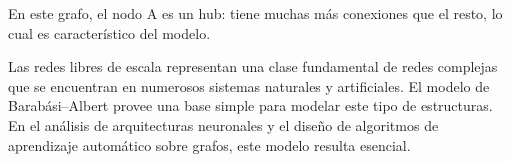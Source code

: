 En este grafo, el nodo A es un hub: tiene muchas más conexiones que el resto, lo cual es característico del modelo.

Las redes libres de escala representan una clase fundamental de redes complejas que se encuentran en numerosos sistemas naturales y artificiales. El modelo de Barabási–Albert provee una base simple para modelar este tipo de estructuras. En el análisis de arquitecturas neuronales y el diseño de algoritmos de aprendizaje automático sobre grafos, este modelo resulta esencial.
